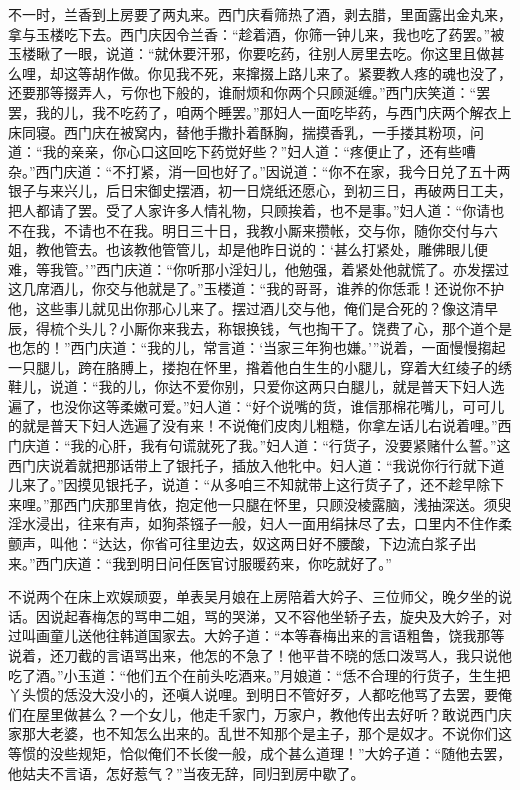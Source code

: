 不一时，兰香到上房要了两丸来。西门庆看筛热了酒，剥去腊，里面露出金丸来，拿与玉楼吃下去。西门庆因令兰香：“趁着酒，你筛一钟儿来，我也吃了药罢。”被玉楼瞅了一眼，说道：“就休要汗邪，你要吃药，往别人房里去吃。你这里且做甚么哩，却这等胡作做。你见我不死，来撺掇上路儿来了。紧要教人疼的魂也没了，还要那等掇弄人，亏你也下般的，谁耐烦和你两个只顾涎缠。”西门庆笑道：“罢罢，我的儿，我不吃药了，咱两个睡罢。”那妇人一面吃毕药，与西门庆两个解衣上床同寝。西门庆在被窝内，替他手撒扑着酥胸，揣摸香乳，一手搂其粉项，问道：“我的亲亲，你心口这回吃下药觉好些？”妇人道：“疼便止了，还有些嘈杂。”西门庆道：“不打紧，消一回也好了。”因说道：“你不在家，我今日兑了五十两银子与来兴儿，后日宋御史摆酒，初一日烧纸还愿心，到初三日，再破两日工夫，把人都请了罢。受了人家许多人情礼物，只顾挨着，也不是事。”妇人道：“你请也不在我，不请也不在我。明日三十日，我教小厮来攒帐，交与你，随你交付与六姐，教他管去。也该教他管管儿，却是他昨日说的：‘甚么打紧处，雕佛眼儿便难，等我管。’”西门庆道：“你听那小淫妇儿，他勉强，着紧处他就慌了。亦发摆过这几席酒儿，你交与他就是了。”玉楼道：“我的哥哥，谁养的你恁乖！还说你不护他，这些事儿就见出你那心儿来了。摆过酒儿交与他，俺们是合死的？像这清早辰，得梳个头儿？小厮你来我去，称银换钱，气也掏干了。饶费了心，那个道个是也怎的！”西门庆道：“我的儿，常言道：‘当家三年狗也嫌。’”说着，一面慢慢搊起一只腿儿，跨在胳膊上，搂抱在怀里，揝着他白生生的小腿儿，穿着大红绫子的绣鞋儿，说道：“我的儿，你达不爱你别，只爱你这两只白腿儿，就是普天下妇人选遍了，也没你这等柔嫩可爱。”妇人道：“好个说嘴的货，谁信那棉花嘴儿，可可儿的就是普天下妇人选遍了没有来！不说俺们皮肉儿粗糙，你拿左话儿右说着哩。”西门庆道：“我的心肝，我有句谎就死了我。”妇人道：“行货子，没要紧赌什么誓。”这西门庆说着就把那话带上了银托子，插放入他牝中。妇人道：“我说你行行就下道儿来了。”因摸见银托子，说道：“从多咱三不知就带上这行货子了，还不趁早除下来哩。”那西门庆那里肯依，抱定他一只腿在怀里，只顾没棱露脑，浅抽深送。须臾淫水浸出，往来有声，如狗茶镪子一般，妇人一面用绢抹尽了去，口里内不住作柔颤声，叫他：“达达，你省可往里边去，奴这两日好不腰酸，下边流白浆子出来。”西门庆道：“我到明日问任医官讨服暖药来，你吃就好了。”

不说两个在床上欢娱顽耍，单表吴月娘在上房陪着大妗子、三位师父，晚夕坐的说话。因说起春梅怎的骂申二姐，骂的哭涕，又不容他坐轿子去，旋央及大妗子，对过叫画童儿送他往韩道国家去。大妗子道：“本等春梅出来的言语粗鲁，饶我那等说着，还刀截的言语骂出来，他怎的不急了！他平昔不晓的恁口泼骂人，我只说他吃了酒。”小玉道：“他们五个在前头吃酒来。”月娘道：“恁不合理的行货子，生生把丫头惯的恁没大没小的，还嗔人说哩。到明日不管好歹，人都吃他骂了去罢，要俺们在屋里做甚么？一个女儿，他走千家门，万家户，教他传出去好听？敢说西门庆家那大老婆，也不知怎么出来的。乱世不知那个是主子，那个是奴才。不说你们这等惯的没些规矩，恰似俺们不长俊一般，成个甚么道理！”大妗子道：“随他去罢，他姑夫不言语，怎好惹气？”当夜无辞，同归到房中歇了。

